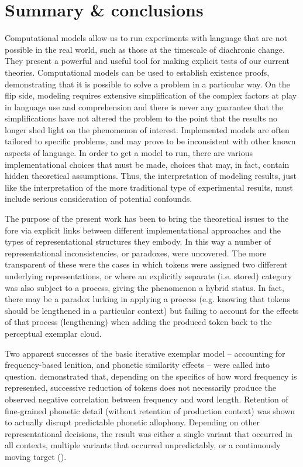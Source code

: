 \section{Summary \& conclusions}

Computational models allow us to run experiments with language that
are not possible in the real world, such as those at the timescale
of diachronic change. They present a powerful and useful tool for making
explicit tests of our current theories. Computational models can be
used to establish existence proofs, demonstrating that it is possible
to solve a problem in a particular way. On the flip side, modeling requires extensive simplification of the complex factors
at play in language use and comprehension and there is never any
guarantee that the simplifications have not altered the problem to
the point that the results no longer shed light on the phenomenon
of interest. Implemented models are often tailored to specific problems,
and may prove to be inconsistent with other known aspects of language.
In order to get a model to run, there are various implementational
choices that must be made, choices that may, in fact, contain hidden
theoretical assumptions. Thus, the interpretation of modeling results,
just like the interpretation of the more traditional type of experimental
results, must include serious consideration of potential confounds. 

The purpose of the present work has been to bring the theoretical
issues to the fore via explicit links between different implementational
approaches and the types of representational structures they embody.
In this way a number of representational inconsistencies, or paradoxes,
were uncovered. The more transparent of these were the cases in which
tokens were assigned two different underlying representations, or
where an explicitly separate (i.e. stored) category was also subject
to a process, giving the phenomenon a hybrid 
status. In fact, there may be a paradox lurking in applying a process
(e.g. knowing that tokens should be lengthened in a particular context)
but failing to account for the effects of that process (lengthening)
when adding the produced token back to the perceptual exemplar cloud. 

Two apparent successes of the basic iterative exemplar model – accounting
for frequency-based lenition, and phonetic similarity effects – were
called into question. 
demonstrated that, depending on the specifics of how word frequency
is represented, successive reduction of tokens does not necessarily
produce the observed negative correlation between frequency and word
length. Retention of fine-grained phonetic detail (without retention
of production context) was shown to actually disrupt predictable phonetic
allophony. Depending on other representational decisions, the result
was either a single variant that occurred in all contexts, multiple
variants that occurred unpredictably, or a continuously moving target
(). 

